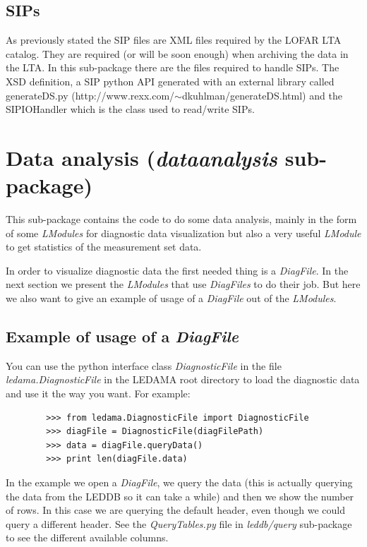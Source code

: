 \documentclass[a4paper,11pt]{article}
\begin{document}
\subsection{SIPs}

As previously stated the SIP files are XML files required by the LOFAR LTA catalog. They are required (or will be soon enough) when archiving the data in the LTA. In this sub-package there are the files required to handle SIPs. The XSD definition, a SIP python API generated with an external library called generateDS.py (http://www.rexx.com/$\sim$dkuhlman/generateDS.html) and the SIPIOHandler which is the class used to read/write SIPs.

\section{Data analysis (\textit{dataanalysis} sub-package)}
\label{sec:dataanal}

This sub-package contains the code to do some data analysis, mainly in the form of some \textit{LModules} for diagnostic data visualization but also a very useful \textit{LModule} to get statistics of the measurement set data.

In order to visualize diagnostic data the first needed thing is a \textit{DiagFile}. In the next section we present the \textit{LModules} that use \textit{DiagFiles} to do their job. But here we also want to give an example of usage of a \textit{DiagFile} out of the \textit{LModules}.

\subsection{Example of usage of a \textit{DiagFile}}

You can use the python interface class \textit{DiagnosticFile} in the file \textit{ledama.DiagnosticFile}  in the LEDAMA root directory to load the diagnostic data and use it the way you want. For example:
\begin{verbatim}
        >>> from ledama.DiagnosticFile import DiagnosticFile
        >>> diagFile = DiagnosticFile(diagFilePath)
        >>> data = diagFile.queryData()
        >>> print len(diagFile.data)
\end{verbatim}
In the example we open a \textit{DiagFile}, we query the data (this is actually querying the data from the LEDDB so it can take a while) and then we show the number of rows. In this case we are querying the default header, even though we could query a different header. See the \textit{QueryTables.py} file in \textit{leddb/query} sub-package to see the different available columns. 
\end{document}
